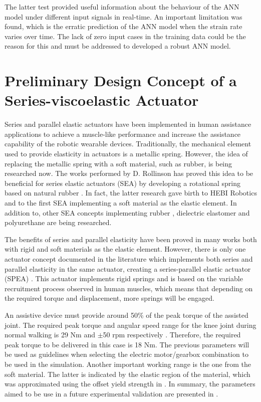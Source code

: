 The latter test provided useful information about the behaviour of the ANN model under different input signals in real-time. An important limitation was found, which is the erratic prediction of the ANN model when the strain rate varies over time. The lack of zero input cases in the training data could be the reason for this and must be addressed to developed a robust ANN model.

\section{Preliminary Design Concept of a Series-viscoelastic Actuator}

Series and parallel elastic actuators have been implemented in human assistance applications to achieve a muscle-like performance and increase the assistance capability of the robotic wearable devices. Traditionally, the mechanical element used to provide elasticity in actuators is a metallic spring. However, the idea of replacing the metallic spring with a soft material, such as rubber, is being researched now. The works performed by D. Rollinson has proved this idea to be beneficial for series elastic actuators (SEA) by developing a rotational spring based on natural rubber \cite{rollinson2013design,rollinson2014design}. In fact, the latter research gave birth to HEBI Robotics and to the first SEA implementing a soft material as the elastic element. In addition to, other SEA concepts implementing rubber \cite{austin2015control}, dielectric elastomer \cite{bolivar2016towards} and polyurethane \cite{martins2015polyurethane} are being researched.

The benefits of series and parallel elasticity have been proved in many works both with rigid and soft materials as the elastic element. However, there is only one actuator concept documented in the literature which implements both series and parallel elasticity in the same actuator, creating a series-parallel elastic actuator (SPEA) \cite{mathijssen2014variable}. This actuator implements rigid springs and is based on the variable recruitment process observed in human muscles, which means that depending on the required torque and displacement, more springs will be engaged.

An assistive device must provide around 50\% of the peak torque of the assisted joint. The required peak torque and angular speed range for the knee joint during normal walking is 29 Nm and $\pm$50 rpm respectively \cite{dos2014impedance}. Therefore, the required peak torque to be delivered in this case is 18 Nm. The previous parameters will be used as guidelines when selecting the electric motor/gearbox combination to be used in the simulation. Another important working range is the one from the soft material. The latter is indicated by the elastic region of the material, which was approximated using the offset yield strength in . In summary, the parameters aimed to be use in a future experimental validation are presented in .

